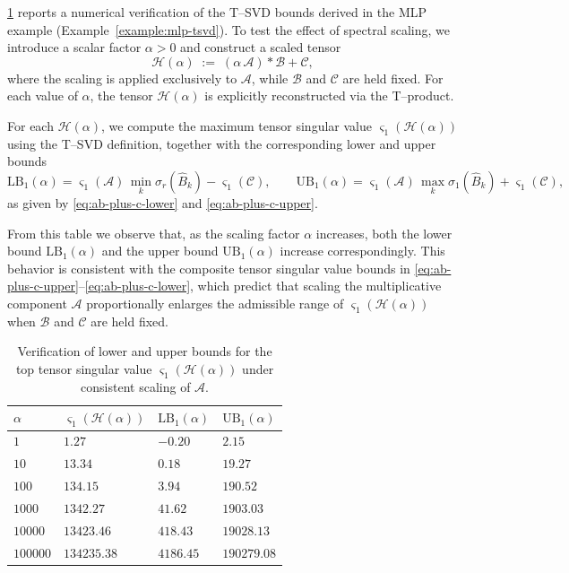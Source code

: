 \documentclass{article}
\theoremstyle{plain}
\theoremstyle{definition}
\theoremstyle{remark}
\begin{document}
\cref{tab:mlp-lb-ub-tsvd} reports a numerical verification of the T--SVD bounds derived in the MLP example (Example~\ref{example:mlp-tsvd}). To test the effect of spectral scaling, we introduce a scalar factor
$\alpha>0$ and construct a scaled tensor
\[
\mathcal{H}(\alpha)
\;:=\;
(\alpha\,\mathcal{A}) * \mathcal{B} + \mathcal{C},
\]
where the scaling is applied exclusively to $\mathcal{A}$, while
$\mathcal{B}$ and $\mathcal{C}$ are held fixed.
For each value of $\alpha$, the tensor $\mathcal{H}(\alpha)$ is explicitly
reconstructed via the T--product.

For each $\mathcal{H}(\alpha)$, we compute the maximum tensor singular value
$\varsigma_1(\mathcal{H}(\alpha))$ using the T--SVD definition, together with
the corresponding lower and upper bounds
\[
\mathrm{LB}_1(\alpha)
=
\varsigma_1(\mathcal{A})\,
\min_{k}\sigma_r(\widehat{B}_k)
-
\varsigma_1(\mathcal{C}),
\qquad
\mathrm{UB}_1(\alpha)
=
\varsigma_1(\mathcal{A})\,
\max_{k}\sigma_1(\widehat{B}_k)
+
\varsigma_1(\mathcal{C}),
\]
as given by \eqref{eq:ab-plus-c-lower} and \eqref{eq:ab-plus-c-upper}.

From this table we observe that, as the scaling factor $\alpha$ increases,
both the lower bound $\mathrm{LB}_1(\alpha)$ and the upper bound
$\mathrm{UB}_1(\alpha)$ increase correspondingly.
This behavior is consistent with the composite tensor singular value bounds
in \eqref{eq:ab-plus-c-upper}--\eqref{eq:ab-plus-c-lower}, which predict that
scaling the multiplicative component $\mathcal{A}$ proportionally enlarges
the admissible range of $\varsigma_1(\mathcal{H}(\alpha))$ when $\mathcal{B}$
and $\mathcal{C}$ are held fixed.


\begin{table}[h]
\centering
\caption{Verification of lower and upper bounds for the top tensor singular value
$\varsigma_1(\mathcal{H}(\alpha))$ under consistent scaling of $\mathcal{A}$.}
\label{tab:mlp-lb-ub-tsvd}
\begin{tabular}{llll}
\hline
$\alpha$
& $\varsigma_1(\mathcal{H}(\alpha))$
& $\mathrm{LB}_1(\alpha)$
& $\mathrm{UB}_1(\alpha)$ \\
\hline
$1$      & $1.27$     & $-0.20$   & $2.15$       \\
$10$     & $13.34$    & $0.18$    & $19.27$      \\
$100$    & $134.15$   & $3.94$    & $190.52$     \\
$1000$   & $1342.27$  & $41.62$   & $1903.03$    \\
$10000$  & $13423.46$ & $418.43$  & $19028.13$   \\
$100000$ & $134235.38$& $4186.45$ & $190279.08$  \\
\hline
\end{tabular}
\end{table}
\end{document}
